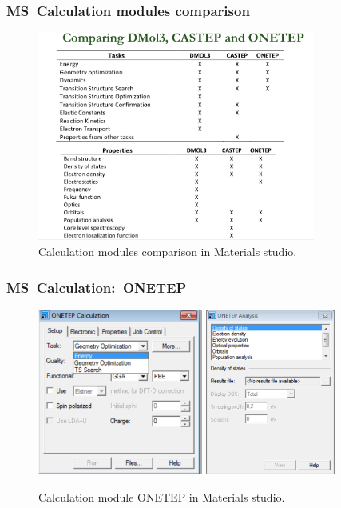 \frame
{
	\frametitle{\textrm{MS~Calculation modules comparison}}
\begin{figure}[h!]
\centering
\vspace*{-0.18in}
\includegraphics[height=2.70in,width=3.60in,viewport=0 0 969 728,clip]{Figures/MS-Caluculator-compare-2.png}
\caption{\tiny \textrm{Calculation modules comparison in Materials studio.}}%
\label{MS-Module_xc-functional}
\end{figure}
}

\frame
{
	\frametitle{\textrm{MS~Calculation:~ONETEP}}
\begin{figure}[h!]
\centering
\vspace*{-0.12in}
\includegraphics[height=2.15in,width=2.14in,viewport=0 0 646 650,clip]{Figures/MS-Caluculator_ONETEP-parameter.png}
\includegraphics[height=2.15in,width=1.68in,viewport=0 0 605 776,clip]{Figures/MS-Caluculator_ONETEP-analysis.png}
\caption{\tiny \textrm{Calculation module ONETEP in Materials studio.}}%
\label{MS-Calculation_ONETEP}
\end{figure}
}

